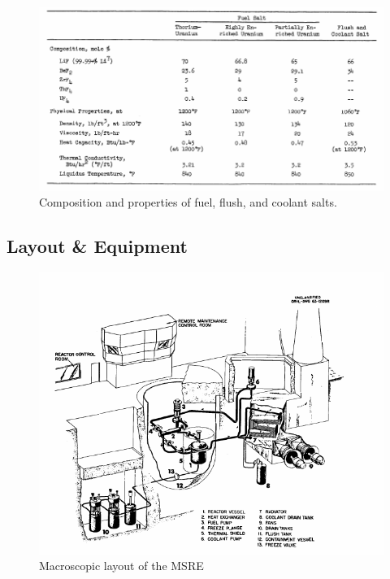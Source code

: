 \documentclass{article}
\let\Oldsubsection\subsection
\renewcommand{\subsection}{\FloatBarrier\Oldsubsection}
\begin{document}
\begin{figure}[htpb]
  \centering
  \includegraphics[max height=.5\textheight,max width=\textwidth,keepaspectratio]{salt_properties.png}
  \caption{Composition and properties of fuel, flush, and coolant
    salts. \cite{robertson_msre_1965}}
  \label{fig:salt_properties}
\end{figure}

\subsection{Layout \& Equipment}

\begin{figure}[htpb]
  \centering
  \includegraphics[max height=.5\textheight,max width=\textwidth,keepaspectratio]{flow_diagram.png}
  \caption{Macroscopic layout of the \gls{MSRE} \cite{robertson_msre_1965}}
  \label{fig:MSRE_layout}
\end{figure}
\end{document}
